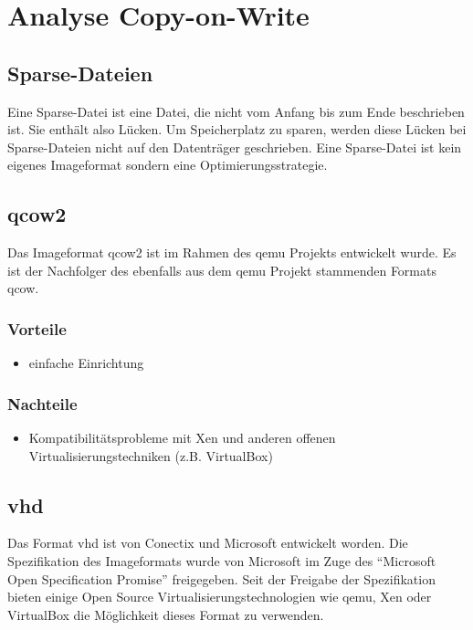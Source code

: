 \chapter{Analyse Copy-on-Write}
\section{Sparse-Dateien}
Eine Sparse-Datei ist eine Datei, die nicht vom Anfang bis zum Ende beschrieben ist. Sie enthält also Lücken. Um Speicherplatz zu sparen, werden diese Lücken bei Sparse-Dateien nicht auf den Datenträger geschrieben. Eine Sparse-Datei ist kein eigenes Imageformat sondern eine Optimierungsstrategie. \cite{sparse}


\section{qcow2}
Das Imageformat qcow2 ist im Rahmen des qemu Projekts entwickelt wurde. Es ist der Nachfolger des ebenfalls aus dem qemu Projekt stammenden Formats qcow. \cite{qcowmarkmc} \cite{qemuwiki}

\subsection{Vorteile}
\begin{itemize}
 \item einfache Einrichtung
\end{itemize}

\subsection{Nachteile}
\begin{itemize}
 \item Kompatibilitätsprobleme mit Xen und anderen offenen Virtualisierungstechniken (z.B. VirtualBox)
\end{itemize}

\section{vhd}
Das Format vhd ist von Conectix und Microsoft entwickelt worden. Die Spezifikation des Imageformats wurde von Microsoft im Zuge des ``Microsoft Open Specification Promise'' freigegeben. Seit der Freigabe der Spezifikation bieten einige Open Source Virtualisierungstechnologien wie qemu, Xen oder VirtualBox die Möglichkeit dieses Format zu verwenden. \cite{msosp} \cite{vhdspec} %


